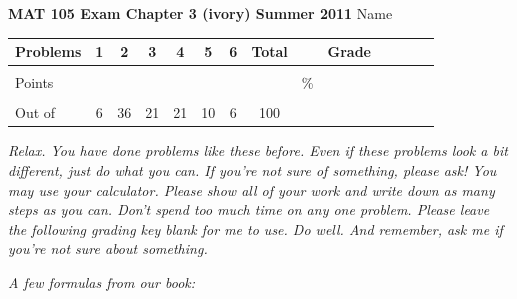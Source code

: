 \documentclass[12pt]{article}
\begin{document}
{\bf MAT 105 Exam Chapter 3 (ivory) Summer 2011} \hspace{.4in} {\large Name} \hrulefill

\hrulefill


\begin{center}

\begin{tabular}
{|l|c|c|c|c|c|c|c|c|c|c|c|c|c|} \hline

 Problems & \hspace{5 pt} 1 \hspace{5 pt}  & \hspace{5 pt} 2 \hspace{5 pt} & \hspace{5 pt} 3 \hspace{5 pt} & \hspace{5 pt} 4 \hspace{5 pt} & \hspace{5 pt} 5 \hspace{5 pt} &  \hspace{5 pt} 6 \hspace{5 pt} &  \hspace{5 pt} Total  \hspace{5 pt} & &  \hspace{5 pt} Grade \hspace{5 pt}  \\ \hline
&&&&&&& &&\\  
Points &&&&&&& &    \hspace{.8in}\% &  \\ 
&&&&&& &&& \\  \hline
Out of & 6 & 36  & 21 & 21 & 10 & 6 &100 & & \\ \hline

\end {tabular}
 
\end{center}

\emph{Relax.  You have done problems like these before.  Even if these problems look a bit different, just do what you can.  If you're not sure of something, please ask! You may use your calculator.  Please show all of your work and write down as many steps as you can.  Don't spend too much time on any one problem.  Please leave the following grading key blank for me to use.  Do well.  And remember, ask me if you're not sure about something.}
 
 \vspace{.1 in}
 
 \emph{A few formulas from our book:}
  \vspace{.2in}
 
\end{document}
